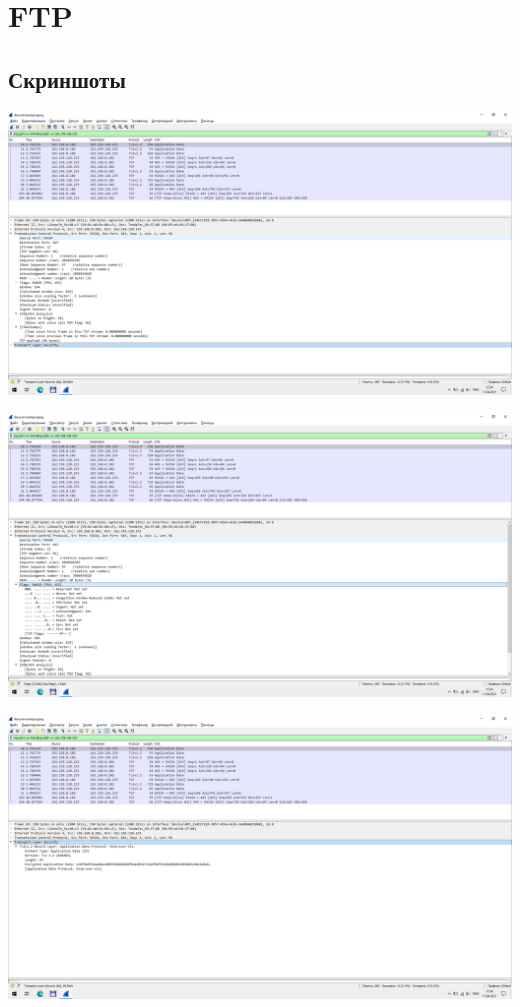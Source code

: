 
\section{FTP}

\subsection{Скриншоты}

\begin{center}

    \includegraphics[width=\textwidth]{screenshots/discord_send_1}

    \includegraphics[width=\textwidth]{screenshots/discord_send_2}

    \includegraphics[width=\textwidth]{screenshots/discord_send_3}


\end{center}
